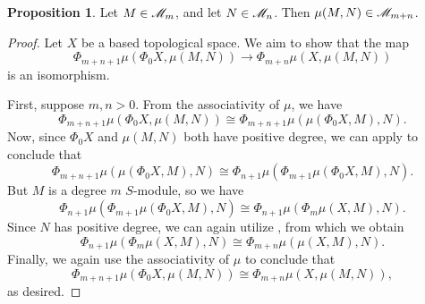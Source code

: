 \documentclass[openany, amssymb, psamsfonts]{amsart}
\theoremstyle{definition}
\newtheorem{prop}{Proposition}[section]
\numberwithin{equation}{section}
\begin{document}
\begin{prop} \label{prop:smash_of_module}
    Let $M \in \mathscr{M}_m$, and let $N \in \mathscr{M}_n$. Then $\mu(M, N) \in \mathscr{M}_{m + n}$.
\end{prop}
\begin{proof} 
    Let $X$ be a based topological space. We aim to show that the map
    \begin{equation*}
        \Phi_{m + n + 1}\mu(\Phi_0 X, \mu(M, N)) \to \Phi_{m + n}\mu(X, \mu(M, N))
    \end{equation*} is an isomorphism.
    
    First, suppose $m, n > 0$. From the associativity of $\mu$, we have
    \begin{equation*}
        \Phi_{m + n + 1}\mu(\Phi_0 X, \mu(M, N)) \cong \Phi_{m + n + 1}\mu(\mu(\Phi_0 X, M), N).
    \end{equation*} Now, since $\Phi_0 X$ and $\mu(M, N)$ both have positive degree, we can apply  to conclude that
    \begin{equation*}
        \Phi_{m + n + 1}\mu(\mu(\Phi_0 X, M), N) \cong \Phi_{n + 1}\mu(\Phi_{m + 1}\mu(\Phi_0 X, M), N).
    \end{equation*} But $M$ is a degree $m$ $S$-module, so we have
    \begin{equation*}
        \Phi_{n + 1}\mu(\Phi_{m + 1}\mu(\Phi_0 X, M), N) \cong \Phi_{n + 1}\mu(\Phi_m\mu(X, M), N).
    \end{equation*} Since $N$ has positive degree, we can again utilize , from which we obtain
    \begin{equation*}
        \Phi_{n + 1}\mu(\Phi_m\mu(X, M), N) \cong \Phi_{m + n}\mu(\mu(X, M), N).
    \end{equation*} Finally, we again use the associativity of $\mu$ to conclude that
    \begin{equation*}
        \Phi_{m + n + 1}\mu(\Phi_0 X, \mu(M, N)) \cong \Phi_{m + n}\mu(X, \mu(M, N)),
    \end{equation*} as desired.


\end{proof}
\end{document}
